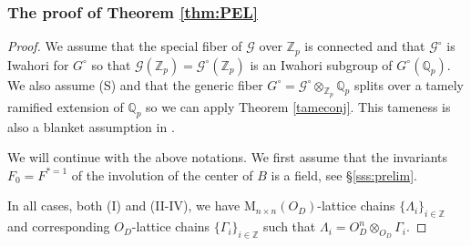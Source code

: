 \documentclass[reqno, 10pt]{amsart}
\newcommand{\BQ}{\ensuremath{\mathbb {Q}}\xspace}
\newcommand{\BZ}{\ensuremath{\mathbb {Z}}\xspace}
\newcommand{\CG}{\ensuremath{\mathcal {G}}\xspace}
\newcommand{\RM}{\ensuremath{\mathrm {M}}\xspace}
\theoremstyle{definition}
\numberwithin{equation}{subsection}
\numberwithin{subsubsection}{subsection}
\begin{document}
 \subsubsection{The proof of Theorem \ref{thm:PEL}}\label{sss:pf712}
 \begin{proof}  We assume   that  the special fiber of  $\CG$ over $\BZ_p$ is connected and that $\CG^\circ$ is Iwahori for $G^\circ$ so that $\CG(\BZ_p)=\CG^\circ(\BZ_p)$ is an Iwahori subgroup of $G^\circ(\BQ_p)$. We also assume (S) and that the generic fiber $G^\circ=\CG^\circ\otimes_{\BZ_p}\BQ_p$ splits over a tamely ramified extension of $\BQ_p$ so we can apply Theorem \ref{tameconj}. This tameness   is also a blanket assumption in \cite{PZ}. 
 
 We will continue with the above notations. We first assume that  the invariants $F_0=F^{*=1}$ of the involution of the center of $B$ is a field, see \S\ref{sss:prelim}.

 
 In all cases, both (I) and (II-IV), we have $\RM_{n\times n}(O_D)$-lattice chains $\{\Lambda_i\}_{i\in \BZ}$ and corresponding 
 $O_D$-lattice chains $\{\Gamma_i\}_{i\in \BZ}$ such that $\Lambda_i=O_D^n\otimes_{O_D}\Gamma_i$.  
 
 
 

\end{proof}
\end{document}

